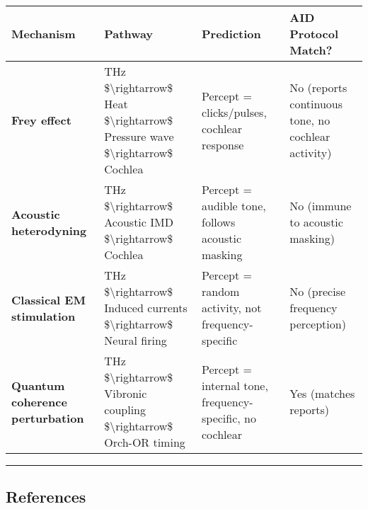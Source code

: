 {\def\LTcaptype{} %
\begin{longtable}[]{@{}
  >{\raggedright\arraybackslash}p{}
  >{\raggedright\arraybackslash}p{}
  >{\raggedright\arraybackslash}p{}
  >{\raggedright\arraybackslash}p{}@{}}
\toprule\noalign{}
\begin{minipage}[b]{\linewidth}\raggedright
Mechanism
\end{minipage} & \begin{minipage}[b]{\linewidth}\raggedright
Pathway
\end{minipage} & \begin{minipage}[b]{\linewidth}\raggedright
Prediction
\end{minipage} & \begin{minipage}[b]{\linewidth}\raggedright
AID Protocol Match?
\end{minipage} \\
\midrule\noalign{}
\endhead
\bottomrule\noalign{}
\endlastfoot
\textbf{Frey effect} & THz \$\textbackslash rightarrow\$ Heat
\$\textbackslash rightarrow\$ Pressure wave
\$\textbackslash rightarrow\$ Cochlea & Percept = clicks/pulses,
cochlear response & No (reports continuous tone, no cochlear
activity) \\
\textbf{Acoustic heterodyning} & THz \$\textbackslash rightarrow\$
Acoustic IMD \$\textbackslash rightarrow\$ Cochlea & Percept = audible
tone, follows acoustic masking & No (immune to acoustic masking) \\
\textbf{Classical EM stimulation} & THz \$\textbackslash rightarrow\$
Induced currents \$\textbackslash rightarrow\$ Neural firing & Percept =
random activity, not frequency-specific & No (precise frequency
perception) \\
\textbf{Quantum coherence perturbation} & THz
\$\textbackslash rightarrow\$ Vibronic coupling
\$\textbackslash rightarrow\$ Orch-OR timing & Percept = internal tone,
frequency-specific, no cochlear & Yes (matches reports) \\
\end{longtable}
}

\begin{center}\rule{0.5\linewidth}{0.5pt}\end{center}

\subsection{References}\label{references}

